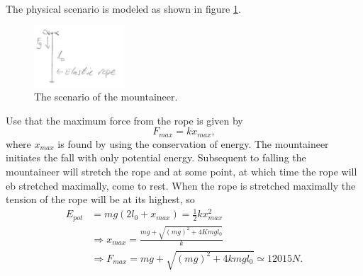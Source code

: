 \begin{example}
\begin{enumerate}
		The physical scenario is modeled as shown in figure \ref{fig:moun}.
		\begin{figure}[H]
			\captionsetup{width=1\textwidth}
			\centering
			\includegraphics[width=0.3\textwidth]{figures/moun}
			\caption{The scenario of the mountaineer.}
			\label{fig:moun}
		\end{figure}
		Use that the maximum force from the rope is given by
		\begin{equation}
			F_{max}=kx_{max},
		\end{equation} 
		where $x_{max}$ is found by using the conservation of energy. The mountaineer initiates the fall with only potential energy. Subsequent to falling the mountaineer will stretch the rope and at some point, at which time the rope will eb stretched maximally, come to rest. When the rope is stretched maximally the tension of the rope will be at its highest, so 
		\begin{equation}
			\begin{split}
				E_{pot}&=mg(2l_0+x_{max})=\frac{1}{2}kx_{max}^2\\
				&\Rightarrow x_{max}=\frac{mg+\sqrt{(mg)^2+4Kmgl_0}}{k}\\
				&\Rightarrow F_{max}=mg+\sqrt{(mg)^2+4kmgl_0}\simeq 12 015 N.
			\end{split}
		\end{equation} 
	\end{enumerate}
\end{example}


